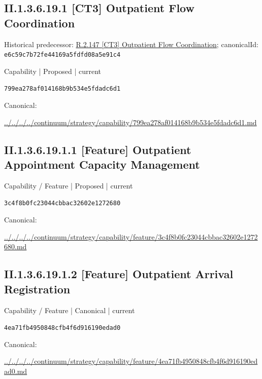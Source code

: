 \documentclass[10pt,a4paper]{article}
\begin{document}
\subsection*{II.1.3.6.19.1 [CT3] Outpatient Flow Coordination}
Historical predecessor: \hyperref[element-e6c59c7b72fe44169a5fdfd08a5e91c4]{R.2.147 [CT3] Outpatient Flow Coordination}; canonicalId: \texttt{e6c59c7b72fe44169a5fdfd08a5e91c4}\par
\label{element-799ea278af014168b9b534e5fdadc6d1}
{\small Capability | Proposed | current}\par
\texttt{799ea278af014168b9b534e5fdadc6d1}\par
Canonical: \par
{\footnotesize\url{../../../../continuum/strategy/capability/799ea278af014168b9b534e5fdadc6d1.md}}\par
\subsection*{II.1.3.6.19.1.1 [Feature] Outpatient Appointment Capacity Management}
\label{element-3c4f8b0fc23044cbbac32602e1272680}
{\small Capability / Feature | Proposed | current}\par
\texttt{3c4f8b0fc23044cbbac32602e1272680}\par
Canonical: \par
{\footnotesize\url{../../../../continuum/strategy/capability/feature/3c4f8b0fc23044cbbac32602e1272680.md}}\par
\subsection*{II.1.3.6.19.1.2 [Feature] Outpatient Arrival Registration}
\label{element-4ea71fb4950848cfb4f6d916190edad0}
{\small Capability / Feature | Canonical | current}\par
\texttt{4ea71fb4950848cfb4f6d916190edad0}\par
Canonical: \par
{\footnotesize\url{../../../../continuum/strategy/capability/feature/4ea71fb4950848cfb4f6d916190edad0.md}}\par
\end{document}
